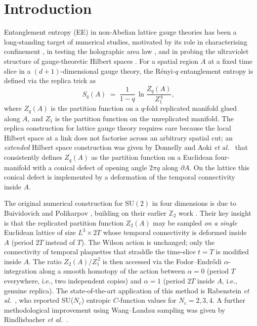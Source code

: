 \documentclass[11pt,a4paper]{article}
\theoremstyle{definition}
\begin{document}
\section{Introduction}
\label{sec:intro}

Entanglement entropy (EE) in non-Abelian lattice gauge theories has
been a long-standing target of numerical studies, motivated by its
role in characterising confinement
\cite{KlebanovKutasovMurugan2008,BP2008}, in testing the holographic
area law \cite{RyuTakayanagi2006,Solodukhin2011}, and in probing the
ultraviolet structure of gauge-theoretic Hilbert spaces
\cite{Donnelly2012,Aoki2015}. For a spatial region $A$ at a fixed
time slice in a $(d+1)$-dimensional gauge theory, the Rényi-$q$
entanglement entropy is defined via the replica trick as
\begin{equation}
   S_q(A) \;=\; \frac{1}{1-q}\, \ln\frac{Z_q(A)}{Z_1^{\,q}},
   \label{eq:Renyi-def}
\end{equation}
where $Z_q(A)$ is the partition function on a $q$-fold replicated
manifold glued along $A$, and $Z_1$ is the partition function on the
unreplicated manifold. The replica construction for lattice gauge
theory requires care because the local Hilbert space at a link does
not factorise across an arbitrary spatial cut; an \emph{extended}
Hilbert space construction was given by Donnelly \cite{Donnelly2012}
and Aoki \emph{et al.}\ \cite{Aoki2015} that consistently defines
$Z_q(A)$ as the partition function on a Euclidean four-manifold with
a conical defect of opening angle $2\pi q$ along $\partial A$. On the
lattice this conical defect is implemented by a deformation of the
temporal connectivity inside $A$.

The original numerical construction for $\mathrm{SU}(2)$ in four
dimensions is due to Buividovich and Polikarpov \cite{BP2008b},
building on their earlier $\mathbb{Z}_2$ work \cite{BP2008}. Their
key insight is that the replicated partition function $Z_2(A)$ may be
sampled \emph{on a single} Euclidean lattice of size $L^3 \times 2T$
whose temporal connectivity is deformed inside $A$ (period $2T$
instead of $T$). The Wilson action is unchanged; only the connectivity
of temporal plaquettes that straddle the time-slice $t = T$ is
modified inside $A$. The ratio $Z_2(A)/Z_1^{\,2}$ is then accessed via
the Fodor--Endr\H{o}di $\alpha$-integration
\cite{FodorEndrodi2007,EndrodiFodor2007} along a smooth homotopy of
the action between $\alpha = 0$ (period $T$ everywhere, i.e., two
independent copies) and $\alpha = 1$ (period $2T$ inside $A$, i.e.,
genuine replica). The state-of-the-art application of this method is
Rabenstein \emph{et al.}\ \cite{Rabenstein2019}, who reported
SU($N_c$) entropic $C$-function values for $N_c = 2,3,4$. A further
methodological improvement using Wang--Landau sampling was given by
Rindlisbacher \emph{et al.}\ \cite{Rindlisbacher2022}.
\end{document}
